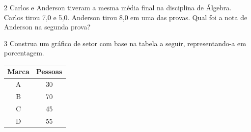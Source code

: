 \begin{escolha}
\begin{boxmedio}
\begin{boxmedio}
{\begin{boxpeq}
\begin{boxpeq}
{\begin{boxpeq}
\begin{boxmedio}
\begin{boxmedio}
\begin{boxpeq}
\begin{boxmedio}
\begin{boxpeq}
\begin{boxpeq}
\begin{boxpeq}
\begin{boxpeq}
\begin{boxmedio}
{\begin{boxmedio}
\begin{boxmedio}
\begin{boxpeq}
\begin{boxmedio}
\begin{boxpeq}
\begin{boxpeq}
\begin{boxpeq}
\begin{escolha}
{\begin{boxmedio}
\begin{boxpeq}
\begin{boxpeq}
\begin{boxpeq}
\begin{boxpeq}
\begin{boxpeq}
\begin{boxmedio}
\begin{boxpeq}
\begin{boxpeq}
\begin{boxpeq}
{\begin{boxpeq}
\begin{boxmedio}
\begin{boxpeq}
\begin{boxpeq}
\begin{boxpeq}
{\begin{boxpeq}
\begin{boxmedio}
{\begin{boxpeq}
\begin{boxpeq}
\begin{boxmedio}
\begin{boxmedio}
\begin{boxpeq}
\begin{boxpeq}
{\begin{boxpeq}
\begin{boxpeq}
\begin{boxpeq}
\begin{boxpeq}
\begin{boxpeq}
\begin{escolha}
\begin{escolha}
{\begin{boxmedio}
\begin{boxpeq}
\begin{q°}
\begin{boxmedio}
\begin{boxpeq}
\begin{boxpeq}
\begin{boxmedio}
\begin{boxmedio}
\begin{boxmedio}
\num{2} Carlos e Anderson tiveram a mesma média final na disciplina de Álgebra.
Carlos tirou 7,0 e 5,0. Anderson tirou 8,0 em uma das provas. Qual foi a nota 
de Anderson na segunda prova?




\num{3} Construa um gráfico de setor com base na tabela a seguir,
representando-a em porcentagem.

\begin{table}[]
\begin{tabular}{|c|c|}
\hline
\rowcolor[HTML]{DAE8FC} 
\textbf{Marca} & \textbf{Pessoas} \\ \hline
A & 30 \\ \hline
B & 70 \\ \hline
C & 45 \\ \hline
D & 55 \\ \hline
\end{tabular}
\end{table}


\end{boxmedio}
\end{boxmedio}
\end{boxmedio}
\end{boxpeq}
\end{boxpeq}
\end{boxmedio}
\end{q°}
\end{boxpeq}
\end{boxmedio}}
\end{escolha}
\end{escolha}
\end{boxpeq}
\end{boxpeq}
\end{boxpeq}
\end{boxpeq}
\end{boxpeq}}
\end{boxpeq}
\end{boxpeq}
\end{boxmedio}
\end{boxmedio}
\end{boxpeq}
\end{boxpeq}}
\end{boxmedio}
\end{boxpeq}}
\end{boxpeq}
\end{boxpeq}
\end{boxpeq}
\end{boxmedio}
\end{boxpeq}}
\end{boxpeq}
\end{boxpeq}
\end{boxpeq}
\end{boxmedio}
\end{boxpeq}
\end{boxpeq}
\end{boxpeq}
\end{boxpeq}
\end{boxpeq}
\end{boxmedio}}
\end{escolha}
\end{boxpeq}
\end{boxpeq}
\end{boxpeq}
\end{boxmedio}
\end{boxpeq}
\end{boxmedio}
\end{boxmedio}}
\end{boxmedio}
\end{boxpeq}
\end{boxpeq}
\end{boxpeq}
\end{boxpeq}
\end{boxmedio}
\end{boxpeq}
\end{boxmedio}
\end{boxmedio}
\end{boxpeq}}
\end{boxpeq}
\end{boxpeq}}
\end{boxmedio}
\end{boxmedio}
\end{escolha}
